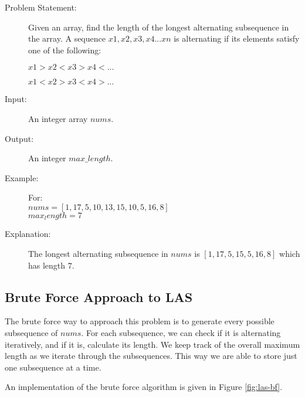 \begin{description}
    \item[Problem Statement:]
        Given an array, find the length of the longest alternating subsequence in the array.
        A sequence ${x1,x2,x3,x4...xn}$ is alternating if its elements satisfy one of the following:

        $x1>x2<x3>x4<...$
        
        $x1<x2>x3<x4>...$
        
    \item[Input:]
        An integer array $nums$.
        
    \item[Output:] 
        An integer $max\_length$.
        
    \item[Example:] For:\\
        $nums = [1,17,5,10,13,15,10,5,16,8]$\\
        $max_length = 7$

    \item[Explanation:]
        The longest alternating subsequence in $nums$ is $[1,17,5,15,5,16,8]$ which has length $7$.

\end{description}

\subsection{Brute Force Approach to LAS}

The brute force way to approach this problem is to generate every possible subsequence of $nums$. 
For each subsequence, we can check if it is alternating iteratively, and if it is, calculate its length.
We keep track of the overall maximum length as we iterate through the subsequences. This way we are able to store just one subsequence at a time.

An implementation of the brute force algorithm is given in Figure \ref{fig:las-bf}.

